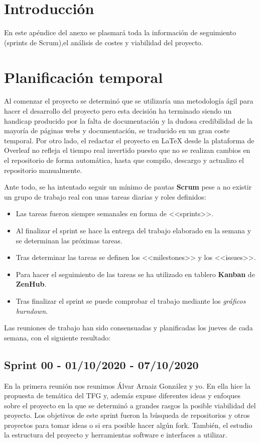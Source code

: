 
\section{Introducción}
En este apéndice del anexo se plasmará toda la información de seguimiento (sprints de Scrum),el análisis de costes y viabilidad del proyecto.


\section{Planificación temporal}
Al comenzar el proyecto se determinó que se utilizaría una metodología ágil para hacer el desarrollo del proyecto pero esta decisión ha terminado siendo un handicap producido por la falta de documentación y la dudosa credibilidad de la mayoría de páginas webs y documentación, se traducido en un gran coste temporal.
Por otro lado, el redactar el proyecto en \LaTeX{} desde la plataforma de Overleaf no refleja el tiempo real invertido puesto que no se realizan cambios en el repositorio de forma automática, hasta que compilo, descargo y actualizo el repositorio manualmente.

Ante todo, se ha intentado seguir un mínimo de pautas \textbf{Scrum} pese a no existir un grupo de trabajo real con unas tareas diarias y roles definidos:
\begin{itemize}
    \item Las tareas fueron siempre semanales en forma de <<sprints>>.
    \item Al finalizar el sprint se hace la entrega del trabajo elaborado en la semana y se determinan las próximas tareas.
    \item Tras determinar las tareas se definen los <<milestones>> y los <<issues>>.
    \item Para hacer el seguimiento de las tareas se ha utilizado en tablero \textbf{Kanban} de \textbf{ZenHub}.
    \item Tras finalizar el sprint se puede comprobar el trabajo mediante los  \textit{gráficos burndown}.
\end{itemize}

Las reuniones de trabajo han sido consensuadas y planificadas los jueves de cada semana, con el siguiente resultado:

\subsection{Sprint 00 - 01/10/2020 - 07/10/2020}
En la primera reunión nos reunimos Álvar Arnaiz González y yo. En ella hice la propuesta de temática del TFG y, además expuse diferentes ideas y enfoques sobre el proyecto en la que se determinó a grandes rasgos la posible viabilidad del proyecto.
Los objetivos de este sprint fueron la búsqueda de repositorios y otros proyectos para tomar ideas o si era posible hacer algún fork. También, el estudio la estructura del proyecto y herramientas software e interfaces a utilizar.

